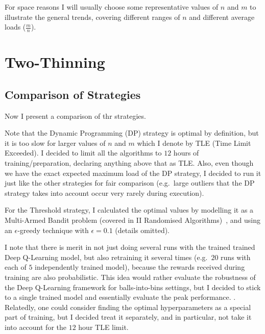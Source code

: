 For space reasons I will usually choose some representative values of $n$ and $m$ to illustrate the general trends, covering different ranges of $n$ and different average loads ($\frac{m}{n}$).




\section{Two-Thinning}


\subsection{Comparison of Strategies}

Now I present a comparison of thr \TwoThinning strategies.


Note that the Dynamic Programming (DP) strategy is optimal by definition, but it is too slow for larger values of $n$ and $m$ which I denote by TLE (Time Limit Exceeded). I decided to limit all the algorithms to $12$ hours of training/preparation, declaring anything above that as TLE. Also, even though we have the exact expected maximum load of the DP strategy, I decided to run it just like the other strategies for fair comparison (e.g.\ large outliers that the DP strategy takes into account occur very rarely during execution).


For the Threshold strategy, I calculated the optimal values by modelling it as a Multi-Armed Bandit problem (covered in II Randomised Algorithms)~\cite{katehakis1987multiarmedbandit}, and using an $\epsilon$-greedy technique with $\epsilon=0.1$ (details omitted).


I note that there is merit in not just doing several runs with the trained trained Deep Q-Learning model, but also retraining it several times (e.g.\ $20$ runs with each of $5$ independently trained model), because the rewards received during training are also probabilistic. This idea would rather evaluate the robustness of the Deep Q-Learning framework for balls-into-bins settings, but I decided to stick to a single trained model and essentially evaluate the peak performance.  . Relatedly, one could consider finding the optimal hyperparameters as a special part of training, but I decided treat it separately, and in particular, not take it into account for the $12$ hour TLE limit.


